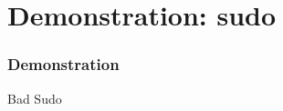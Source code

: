 \section{Demonstration: sudo}

\begin{frame}
  \frametitle{Demonstration}

  \begin{center}
    \Huge Bad Sudo
  \end{center}
%
\end{frame}

